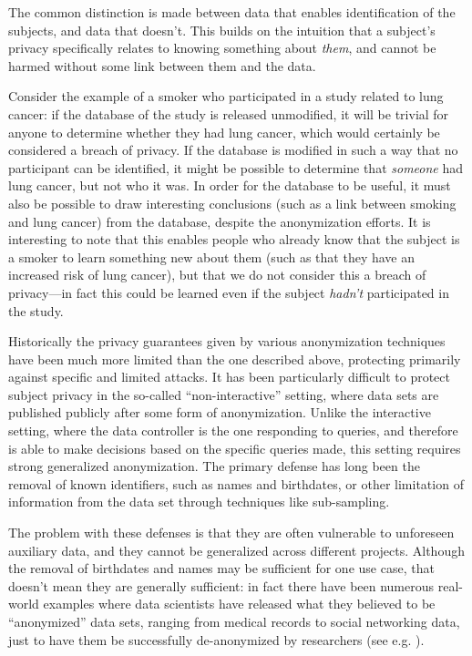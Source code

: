 \documentclass[12pt]{article}
\begin{document}
The common distinction is made between data that enables identification of the subjects, and data that doesn't. This builds on the intuition that a subject's privacy specifically relates to knowing something about \emph{them}, and cannot be harmed without some link between them and the data.

Consider the example of a smoker who participated in a study related to lung cancer: if the database of the study is released unmodified, it will be trivial for anyone to determine whether they had lung cancer, which would certainly be considered a breach of privacy. If the database is modified in such a way that no participant can be identified, it might be possible to determine that \emph{someone} had lung cancer, but not who it was. In order for the database to be useful, it must also be possible to draw interesting conclusions (such as a link between smoking and lung cancer) from the database, despite the anonymization efforts. It is interesting to note that this enables people who already know that the subject is a smoker to learn something new about them (such as that they have an increased risk of lung cancer), but that we do not consider this a breach of privacy---in fact this could be learned even if the subject \emph{hadn't} participated in the study. \bigskip

Historically the privacy guarantees given by various anonymization techniques have been much more limited than the one described above, protecting primarily against specific and limited attacks. It has been particularly difficult to protect subject privacy in the so-called ``non-interactive'' setting, where data sets are published publicly after some form of anonymization. Unlike the interactive setting, where the data controller is the one responding to queries, and therefore is able to make decisions based on the specific queries made, this setting requires strong generalized anonymization. The primary defense has long been the removal of known identifiers, such as names and birthdates, or other limitation of information from the data set through techniques like sub-sampling.

The problem with these defenses is that they are often vulnerable to unforeseen auxiliary data, and they cannot be generalized across different projects. Although the removal of birthdates and names may be sufficient for one use case, that doesn't mean they are generally sufficient: in fact there have been numerous real-world examples where data scientists have released what they believed to be ``anonymized'' data sets, ranging from medical records to social networking data, just to have them be successfully de-anonymized by researchers (see e.g. \cite{reidentification2011}).
\end{document}
